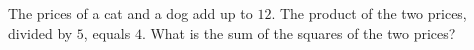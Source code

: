 The prices of a cat and a dog add up to $12$. The product of the two prices, divided by $5$, equals $4$. What is the sum of the squares of the two prices?
